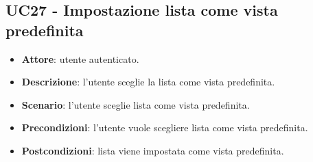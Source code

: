 \subsection{UC27 - Impostazione lista come vista predefinita}
\begin{itemize}
    \item \textbf{Attore}: utente autenticato.
    \item \textbf{Descrizione}: l'utente sceglie la lista come vista predefinita.
    \item \textbf{Scenario}: l'utente sceglie lista come vista predefinita.
    \item \textbf{Precondizioni}: l'utente vuole scegliere lista come vista predefinita.
    \item \textbf{Postcondizioni}: lista viene impostata come vista predefinita.
\end{itemize}





